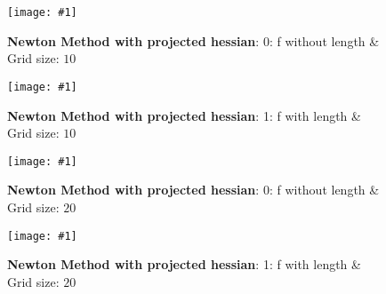 \documentclass[multi=page,crop,border=15pt,varwidth=120cm]{standalone}
\newcommand{\newresult}[2]{%
\begin{figure}[H]
    \texttt{[image: \#1]}
    \caption{#2}
\end{figure}
}
\begin{document}
\begin{page}
    \begin{minipage}[t]{14cm}
        \newresult{execution_NewtonMethods_1_0_10___optimized}{\textbf{Newton Method with projected hessian}: 0: f without length \& Grid size: $10$}
    \end{minipage}
    \begin{minipage}[t]{14cm}
        \newresult{execution_NewtonMethods_1_1_10___optimized}{\textbf{Newton Method with projected hessian}: 1: f with length \& Grid size: $10$}
    \end{minipage}
\end{page}

\begin{page}
    \begin{minipage}[t]{14cm}
        \newresult{execution_NewtonMethods_1_0_20___optimized}{\textbf{Newton Method with projected hessian}: 0: f without length \& Grid size: $20$}
    \end{minipage}
    \begin{minipage}[t]{14cm}
        \newresult{execution_NewtonMethods_1_1_20___optimized}{\textbf{Newton Method with projected hessian}: 1: f with length \& Grid size: $20$}
    \end{minipage}
\end{page}
\end{document}
